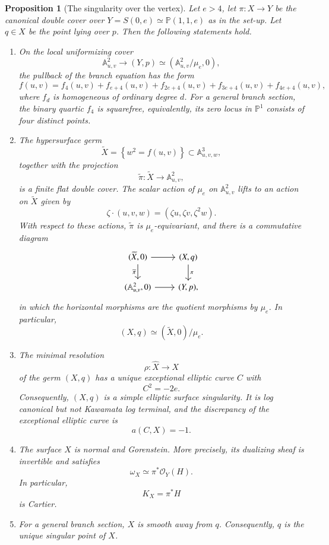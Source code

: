 \documentclass[11pt,twoside]{amsart}
\theoremstyle{plain}
\numberwithin{equation}{section}
\newtheorem{proposition}[theorem]{Proposition}
\theoremstyle{definition}
\begin{document}
\begin{proposition}[The singularity over the vertex]
\label{thm:singularity-canonical-double-cover-cone}
Let $e>4$, let $\pi:X\longrightarrow Y$
be the canonical double cover over $Y=S(0,e)\simeq \mathbb{P}(1,1,e)$ as in the set-up. Let $q\in X$ be the point lying over $p$. Then the following statements hold.

\begin{enumerate}
    \item On the local uniformizing cover
    $$
    \mathbb{A}^2_{u,v}
    \longrightarrow
    (Y,p)
    \simeq
    \left(
    \mathbb{A}^2_{u,v}/\mu_e,0
    \right),
    $$
    the pullback of the branch equation has the form
    $$
    f(u,v)
    =
    f_4(u,v)
    +
    f_{e+4}(u,v)
    +
    f_{2e+4}(u,v)
    +
    f_{3e+4}(u,v)
    +
    f_{4e+4}(u,v),
    $$
    where $f_d$ is homogeneous of ordinary degree $d$. For a general branch section, the binary quartic $f_4$ is squarefree, equivalently, its zero locus in $\mathbb{P}^1$ consists of four distinct points.

   
\item The hypersurface germ
$$
\widetilde X
=
\left\{
w^2=f(u,v)
\right\}
\subset
\mathbb A^3_{u,v,w},
$$
together with the projection
$$
\widetilde{\pi}:\widetilde X\longrightarrow \mathbb A^2_{u,v},
$$
is a finite flat double cover. The scalar action of $\mu_e$ on
$\mathbb A^2_{u,v}$ lifts to an action on $\widetilde X$ given by
$$
\zeta\cdot(u,v,w)
=
(\zeta u,\zeta v,\zeta^2w).
$$
With respect to these actions, $\widetilde{\pi}$ is $\mu_e$-equivariant, and
there is a commutative diagram
$$
\begin{tikzcd}
(\widetilde X,0)
\arrow[r]
\arrow[d,"\widetilde{\pi}"']
&
(X,q)
\arrow[d,"\pi"]
\\
(\mathbb A^2_{u,v},0)
\arrow[r]
&
(Y,p),
\end{tikzcd}
$$
in which the horizontal morphisms are the quotient morphisms by $\mu_e$.
In particular,
$$
(X,q)
\simeq
(\widetilde X,0)/\mu_e.
$$


   \item The minimal resolution
    $$
    \rho:\widehat X\longrightarrow X
    $$
    of the germ $(X,q)$ has a unique exceptional elliptic curve $C$ with
    $$
    C^2=-2e.
    $$
    Consequently, $(X,q)$ is a simple elliptic surface singularity. It is log canonical but not Kawamata log terminal, and the discrepancy of the exceptional elliptic curve is
    $$
    a(C,X)=-1.
    $$

    \item The surface $X$ is normal and Gorenstein. More precisely, its dualizing sheaf is invertible and satisfies
    $$
    \omega_X
    \simeq
    \pi^*\mathcal{O}_Y(H).
    $$
    In particular,
    $$
    K_X=\pi^*H
    $$
    is Cartier.
    \item For a general branch section, $X$ is smooth away from $q$. Consequently, $q$ is the unique singular point of $X$.
    \end{enumerate}
\end{proposition}
\end{document}
